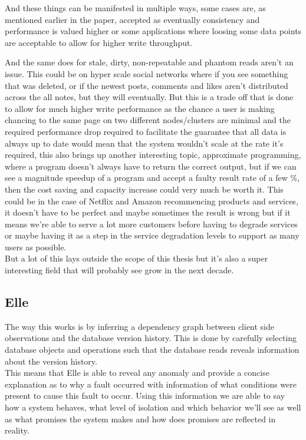 \documentclass[a4paper,10pt,titlepage]{report}
\begin{document}
    And these things can be manifested in multiple ways, some cases are, as mentioned earlier in the paper, accepted as eventually consistency and performance is valued higher or some applications where loosing some data points are acceptable to allow for higher write throughput.\\
    \vspace{5mm}

    And the same does for stale, dirty, non-repeatable and phantom reads aren't an issue. This could be on hyper scale social networks where if you see something that was deleted, or if the newest posts, comments and likes aren't distributed across the all notes, but they will eventually. But this is a trade off that is done to allow for much higher write performance as the chance a user is making chancing to the same page on two different nodes/clusters are minimal and the required performance drop required to facilitate the guarantee that all data is always up to date would mean that the system wouldn't scale at the rate it's required, this also brings up another interesting topic, approximate programming, where a program doesn't always have to return the correct output, but if we can see a magnitude speedup of a program and accept a faulty result rate of a few \%, then the cost saving and capacity increase could very much be worth it. This could be in the case of Netflix and Amazon recommencing products and services, it doesn't have to be perfect and maybe sometimes the result is wrong but if it means we're able to serve a lot more customers before having to degrade services or maybe having it as a step in the service degradation levels to support as many users as possible. \\
    \vspace{5mm}
    But a lot of this lays outside the scope of this thesis but it's also a super interesting field that will probably see grow in the next decade.


    \subsection{Elle}
    
    
    The way this works is by inferring a dependency graph between client side observations and the database version history. This is done by carefully selecting database objects and operations such that the database reads reveals information about the version history.\\
    \vspace{5mm}
    This means that Elle is able to reveal any anomaly and provide a concise explanation as to why a fault occurred with information of what conditions were present to cause this fault to occur. Using this information we are able to say how a system behaves, what level of isolation and which behavior we'll see as well as what promises the system makes and how does promises are reflected in reality.\\
    
\end{document}
